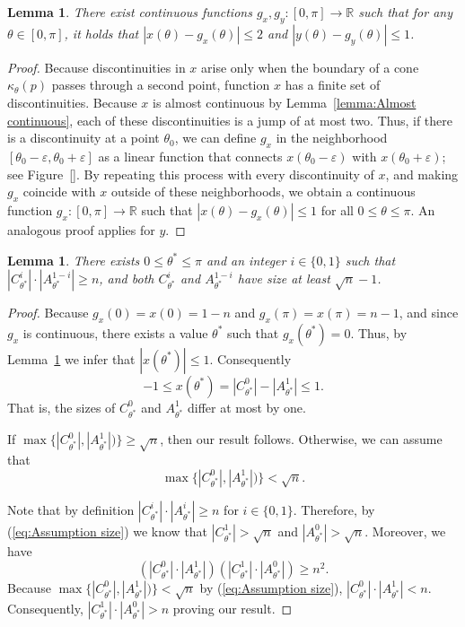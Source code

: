 \documentclass[a4paper, 11pt]{article}
\newtheorem{lemma}[theorem]{Lemma}
\newcommand{\we}{{\ensuremath{\theta}}}
\newcommand{\cone}[1]{\ensuremath{\kappa_{\we}(#1)}}
\begin{document}
\begin{lemma}\label{lemma:Similar function}
There exist continuous functions $g_x, g_y:[0, \pi]\to \mathbb{R}$ such that for any $\we\in [0, \pi]$, it holds that  $| x(\we) - g_x(\we) | \leq 2$ and $| y(\we) - g_y(\we) |\leq 1$.
\end{lemma}
\begin{proof}
Because discontinuities in $x$ arise only when the boundary of a cone $\cone{p}$ passes through a second point, function $x$ has a finite set of discontinuities. Because $x$ is almost continuous by Lemma~\ref{lemma:Almost continuous}, each of these discontinuities is a jump of at most two. 
Thus, if there is a discontinuity at a point $\theta_0$, we can define $g_x$ in the neighborhood $[\theta_0-\varepsilon, \theta_0+\varepsilon]$ as a linear function that connects $x(\theta_0-\varepsilon)$ with $x(\theta_0 + \varepsilon)$; see Figure~\ref{}.
By repeating this process with every discontinuity of $x$, and making $g_x$ coincide with $x$ outside of these neighborhoods, we obtain a continuous function $g_x:[0, \pi] \to \mathbb{R}$ such that $| x(\we) - g_x(\we) | \leq 1$ for all $0\leq \we \leq \pi$. An analogous proof applies for $y$.
\end{proof}


\begin{lemma}
There exists $0\leq \we^* \leq \pi$ and an integer $i\in \{0, 1\}$ such that 
$|C^i_{\we^*}| \cdot |A^{1-i}_{\we^*}| \geq n$, and both $C^i_{\we^*}$ and $A^{1-i}_{\we^*}$ have size  at least $\sqrt{n}-1$.
\end{lemma}
\begin{proof}
Because $g_x(0) = x(0) = 1-n$ and $g_x(\pi) = x(\pi) = n-1$, and since $g_x$ is continuous, there exists a value $\we^*$ such that $g_x(\we^*) = 0$.
Thus, by Lemma~\ref{lemma:Similar function} we infer that $|x(\we^*)| \leq 1$.
Consequently $$-1\leq x(\we^*) = |C^0_{\we^*}| - |A^1_{\we^*}| \leq 1.$$ 
That is, the sizes of $C^0_{\we^*}$ and $A^1_{\we^*}$ differ at most by one.

If $\max\{|C^0_{\we^*}|, |A^1_{\we^*}|)\} \geq \sqrt{n}$, then our result follows. Otherwise, we can assume that 
\begin{equation}\label{eq:Assumption size}
\max\{|C^0_{\we^*}|, |A^1_{\we^*}|)\} < \sqrt{n}.
\end{equation}



Note that by definition $|C^i_{\we^*}| \cdot |A^i_{\we^*}| \geq n$ for $i\in \{0, 1\}$. 
Therefore, by (\ref{eq:Assumption size}) we know that $|C^1_{\we^*}| > \sqrt{n}$ and $|A^0_{\we^*}| > \sqrt{n}$.
Moreover, we have 
$$(|C^0_{\we^*}|\cdot |A^1_{\we^*}|) (|C^1_{\we^*}|\cdot |A^0_{\we^*}|) \geq n^2.$$
Because $\max\{|C^0_{\we^*}|, |A^1_{\we^*}|)\} < \sqrt{n}$ by (\ref{eq:Assumption size}), $|C^0_{\we^*}|\cdot |A^1_{\we^*}| < n$. 
Consequently, $|C^1_{\we^*}|\cdot |A^0_{\we^*}| > n$ proving our result.
\end{proof}
\end{document}
